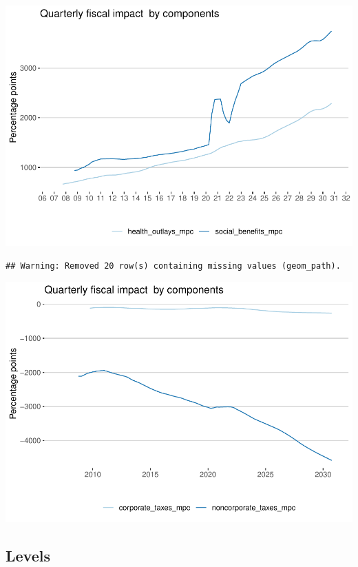 \documentclass[
]{article}
\begin{document}
\begin{center}\includegraphics{projections_files/figure-latex/health consumption-1} \end{center}

\begin{verbatim}
## Warning: Removed 20 row(s) containing missing values (geom_path).
\end{verbatim}

\begin{center}\includegraphics{projections_files/figure-latex/taxes consumption-1} \end{center}

\hypertarget{levels}{%
\subsection{Levels}\label{levels}}
\end{document}

